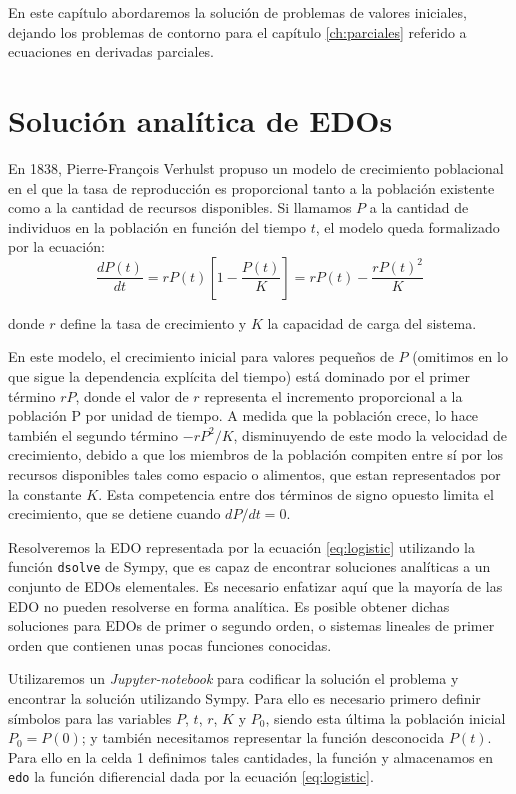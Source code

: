 En este capítulo abordaremos la solución de problemas de valores iniciales, dejando los problemas de contorno para el capítulo \ref{ch:parciales} referido a ecuaciones en derivadas parciales.

\section{Solución analítica de EDOs} \label{sec:edo-anal}
En 1838, Pierre-François Verhulst propuso un modelo de crecimiento poblacional en el que la tasa de reproducción es proporcional tanto a la población existente como a la cantidad de recursos disponibles. Si llamamos $P$ a la cantidad de individuos en la población en función del tiempo $t$, el modelo queda formalizado por la ecuación:
\begin{equation}\label{eq:logistic}
 \frac{dP(t)}{dt} = r P(t) \left[ 1 - \frac{P(t)}{K} \right] = r P(t) - \frac{r P(t)^2}{K}
\end{equation} 


donde $r$ define la tasa de crecimiento y $K$ la capacidad de carga del sistema.

En este modelo, el crecimiento inicial para valores pequeños de $P$ (omitimos en lo que sigue la dependencia explícita del tiempo) está dominado por el primer término $rP$, donde el valor de $r$ representa el incremento proporcional a la población P por unidad de tiempo. A medida que la población crece, lo hace también el segundo término $-rP^2/K$, disminuyendo de este modo la velocidad de crecimiento, debido a que los miembros de la población compiten entre sí por los recursos disponibles tales como espacio o alimentos, que estan representados por la constante $K$. Esta competencia entre dos términos de signo opuesto limita el crecimiento, que se detiene cuando $dP/dt = 0$.

Resolveremos la EDO representada por la ecuación \ref{eq:logistic} utilizando la función \verb|dsolve| de Sympy, que es capaz de encontrar soluciones analíticas a un conjunto de EDOs elementales. Es necesario enfatizar aquí que la mayoría de las EDO no pueden resolverse en forma analítica. Es posible obtener dichas soluciones para EDOs de primer o segundo orden, o sistemas lineales de primer orden que contienen unas pocas funciones conocidas. 

Utilizaremos un \textit{Jupyter-notebook} para codificar la solución el problema y encontrar la solución utilizando Sympy. Para ello es necesario primero definir símbolos para las variables $P$, $t$, $r$, $K$ y $P_0$, siendo esta última la población inicial $P_0 = P(0)$; y también necesitamos representar la función desconocida $P(t)$. Para ello en la celda 1 definimos tales cantidades, la función y almacenamos en \verb|edo| la función difierencial dada por la ecuación \ref{eq:logistic}.

